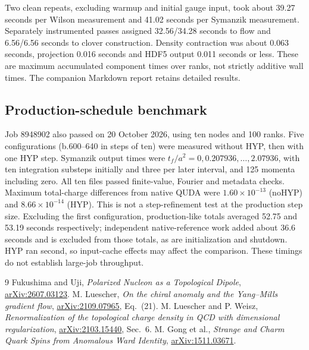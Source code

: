 \documentclass[11pt,a4paper]{article}
\begin{document}
Two clean repeats, excluding warmup and initial gauge input, took about
39.27 seconds per Wilson measurement and 41.02 seconds per Symanzik measurement.
Separately instrumented passes assigned 32.56/34.28 seconds to flow and
6.56/6.56 seconds to clover construction. Density contraction was about
0.063 seconds, projection 0.016 seconds and HDF5 output 0.011 seconds or less.
These are maximum accumulated component times over ranks, not strictly
additive wall times. The companion Markdown report retains detailed results.

\subsection{Production-schedule benchmark}
Job 8948902 also passed on 20 October 2026, using ten nodes and 100 ranks.
Five configurations (b.600--640 in steps of ten) were measured without HYP,
then with one HYP step. Symanzik output times were
$t_f/a^2=0,0.207936,\ldots,2.07936$, with ten integration substeps initially
and three per later interval, and 125 momenta including zero.
All ten files passed finite-value, Fourier and metadata checks. Maximum
total-charge differences from native QUDA were $1.60\times10^{-13}$ (noHYP)
and $8.66\times10^{-14}$ (HYP). This is not a step-refinement test at the
production step size.
Excluding the first configuration, production-like totals averaged
52.75 and 53.19 seconds respectively; independent native-reference work
added about 36.6 seconds and is excluded from those totals, as are
initialization and shutdown. HYP ran second, so input-cache effects may
affect the comparison. These timings do not establish large-job throughput.

\begin{thebibliography}{9}
 Fukushima and Uji, \emph{Polarized Nucleon as a
Topological Dipole}, \href{https://arxiv.org/abs/2607.03123}{arXiv:2607.03123}.
 M. Luescher, \emph{On the chiral anomaly and the Yang--Mills
gradient flow}, \href{https://arxiv.org/abs/2109.07965}{arXiv:2109.07965}, Eq.~(21).
 M. Luescher and P. Weisz, \emph{Renormalization of the topological
charge density in QCD with dimensional regularization},
\href{https://arxiv.org/abs/2103.15440}{arXiv:2103.15440}, Sec.~6.
 M. Gong et al., \emph{Strange and Charm Quark Spins from Anomalous
Ward Identity}, \href{https://arxiv.org/abs/1511.03671}{arXiv:1511.03671}.
\end{thebibliography}
\end{document}
